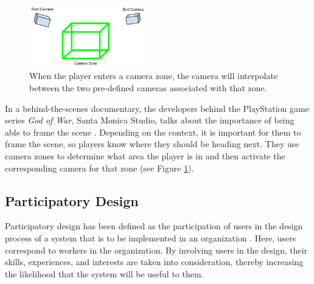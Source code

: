 

\begin{figure}[htbp]
\centering
\includegraphics[width=0.45\textwidth]{Pics/gow_cameraZones2}
\caption{When the player enters a camera zone, the camera will interpolate between the two pre-defined cameras associated with that zone.}
\label{fig:gow_zones}
\end{figure}

In a behind-the-scenes documentary, the developers behind the PlayStation game series \textit{God of War}, Santa Monica Studio, talks about the importance of being able to frame the scene \cite{gow_camera}. Depending on the context, it is important for them to frame the scene, so players know where they should be heading next. They use camera zones to determine what area the player is in and then activate the corresponding camera for that zone (see Figure \ref{fig:gow_zones}).




\subsection{Participatory Design}
Participatory design has been defined as the participation of users in the design process of a system that is to be implemented in an organization \cite{kensing_participatory_1998}. Here, users correspond to workers in the organization. By involving users in the design, their skills, experiences, and interests are taken into consideration, thereby increasing the likelihood that the system will be useful to them.


